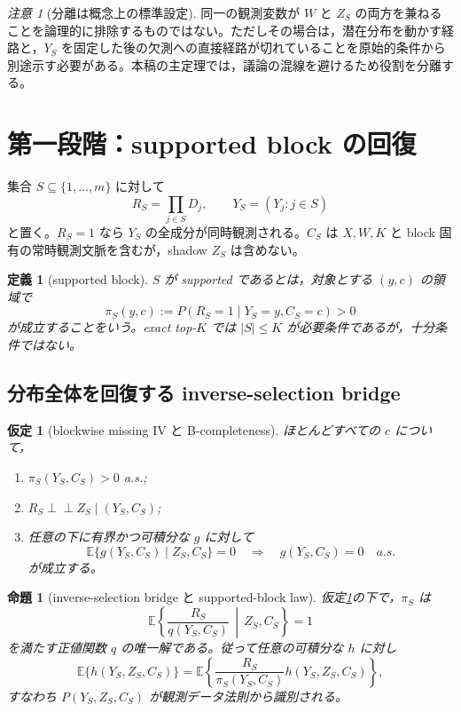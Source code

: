 \documentclass[11pt,a4paper]{ltjsarticle}
\newtheorem{assumption}{仮定}[section]
\newtheorem{proposition}{命題}[section]
\newtheorem{definition}{定義}[section]
\theoremstyle{remark}\newtheorem{remark}{注意}[section]
\newcommand{\E}{\mathbb E}
\newcommand{\ind}{\perp\!\!\!\perp}
\newcommand{\given}{\,\middle|\,}
\begin{document}
\begin{remark}[分離は概念上の標準設定]
同一の観測変数が $W$ と $Z_S$ の両方を兼ねることを論理的に排除するものではない。ただしその場合は，潜在分布を動かす経路と，$Y_S$ を固定した後の欠測への直接経路が切れていることを原始的条件から別途示す必要がある。本稿の主定理では，議論の混線を避けるため役割を分離する。
\end{remark}

\section{第一段階：supported block の回復}

集合 $S\subseteq\{1,\ldots,m\}$ に対して
\[
R_S=\prod_{j\in S}D_j,\qquad Y_S=(Y_j:j\in S)
\]
と置く。$R_S=1$ なら $Y_S$ の全成分が同時観測される。$C_S$ は $X,W,K$ と block 固有の常時観測文脈を含むが，shadow $Z_S$ は含めない。

\begin{definition}[supported block]
$S$ が \emph{supported} であるとは，対象とする $(y,c)$ の領域で
\[
\pi_S(y,c):=P(R_S=1\mid Y_S=y,C_S=c)>0
\]
が成立することをいう。exact top-$K$ では $|S|\le K$ が必要条件であるが，十分条件ではない。
\end{definition}

\subsection{分布全体を回復する inverse-selection bridge}

\begin{assumption}[blockwise missing IV と B-completeness]\label{as:fullbridge}
ほとんどすべての $c$ について，
\begin{enumerate}[label=(B\arabic*)]
\item $\pi_S(Y_S,C_S)>0$ a.s.;
\item $R_S\ind Z_S\mid(Y_S,C_S)$;
\item 任意の下に有界かつ可積分な $g$ に対して
\[
\E\{g(Y_S,C_S)\mid Z_S,C_S\}=0
\quad\Longrightarrow\quad g(Y_S,C_S)=0\quad a.s.
\]
が成立する。
\end{enumerate}
\end{assumption}

\begin{proposition}[inverse-selection bridge と supported-block law]\label{prop:blockfull}
仮定\ref{as:fullbridge}の下で，$\pi_S$ は
\begin{equation}
\E\left\{\frac{R_S}{q(Y_S,C_S)}\given Z_S,C_S\right\}=1\label{eq:inverse-moment}
\end{equation}
を満たす正値関数 $q$ の唯一解である。従って任意の可積分な $h$ に対し
\begin{equation}
\E\{h(Y_S,Z_S,C_S)\}
=
\E\left\{\frac{R_S}{\pi_S(Y_S,C_S)}h(Y_S,Z_S,C_S)\right\},\label{eq:block-ipw}
\end{equation}
すなわち $P(Y_S,Z_S,C_S)$ が観測データ法則から識別される。
\end{proposition}
\end{document}
